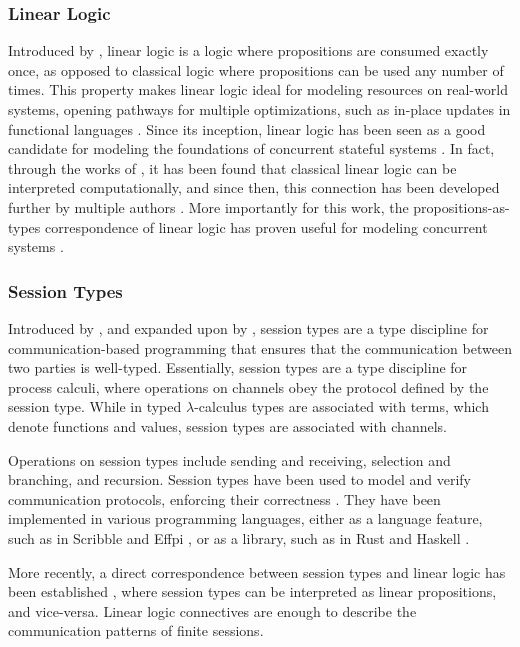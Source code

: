 \documentclass[sigconf,nonacm,natbib=true]{acmart}
\begin{document}
\subsubsection{Linear Logic}

Introduced by \citet{Girard:1987}, linear logic is a logic where propositions are consumed exactly once, as opposed to classical logic where propositions can be used any number of times. This property makes linear logic ideal for modeling resources on real-world systems, opening pathways for multiple optimizations, such as in-place updates in functional languages \citep{Hofmann:2000}. Since its inception, linear logic has been seen as a good candidate for modeling the foundations of concurrent stateful systems \citep{Wadler:1990}. In fact, through the works of \citet{Abramsky:1993}, it has been found that classical linear logic can be interpreted computationally, and since then, this connection has been developed further by multiple authors \citep{Turner:1999}. More importantly for this work, the propositions-as-types correspondence of linear logic has proven useful for modeling concurrent systems \cite{Caires:2010}.

\subsubsection{Session Types}

Introduced by \citet{Honda:1993}, and expanded upon by \citet{Honda:1998}, session types are a type discipline for communication-based programming that ensures that the communication between two parties is well-typed. Essentially, session types are a type discipline for process calculi, where operations on channels obey the protocol defined by the session type. While in typed $\lambda$-calculus types are associated with terms, which denote functions and values, session types are associated with channels.

Operations on session types include sending and receiving, selection and branching, and recursion. Session types have been used to model and verify communication protocols, enforcing their correctness \citep{Huttel:2016}. They have been implemented in various programming languages, either as a language feature, such as in Scribble \citep{Yoshida:2014} and Effpi \citep{Scalas:2019}, or as a library, such as in Rust \citep{Jespersen:2015} and Haskell \citep{Pucella:2008}.

More recently, a direct correspondence between session types and linear logic has been established \citep{Caires:2010, Wadler:2012, Caires:2012, Caires:2016, Giunti:2016}, where session types can be interpreted as linear propositions, and vice-versa. Linear logic connectives are enough to describe the communication patterns of finite sessions.
\end{document}
